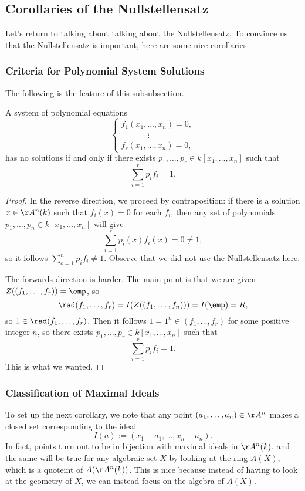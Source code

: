 \subsection{Corollaries of the Nullstellensatz}
Let's return to talking about talking about the Nullstellensatz. To convince us that the Nullstellensatz is important, here are some nice corollaries.

\subsubsection{Criteria for Polynomial System Solutions}
The following is the feature of this subsubsection.
\begin{corollary}
	A system of polynomial equations
	\[\begin{cases}
		f_1(x_1,\ldots,x_n) = 0, \\
		\qquad\quad~\vdots \\
		f_r(x_1,\ldots,x_n) = 0,
	\end{cases}\]
	has no solutions if and only if there exists $p_1,\ldots,p_r\in k[x_1,\ldots,x_n]$ such that
	\[\sum_{i=1}^rp_if_i=1.\]
\end{corollary}
\begin{proof}
	In the reverse direction, we proceed by contraposition: if there is a solution $x\in\AA^n(k)$ such that $f_i(x)=0$ for each $f_i$, then any set of polynomials $p_1,\ldots,p_n\in k[x_1,\ldots,x_n]$ will give
	\[\sum_{i=1}^rp_i(x)f_i(x)=0\ne1,\]
	so it follows $\sum_{o=1}^np_if_i\ne1$. Observe that we did not use the Nullstellensatz here.

	The forwards direction is harder. The main point is that we are given $Z((f_1,\ldots,f_r))=\emp$, so
	\[\rad(f_1,\ldots,f_r)=I(Z((f_1,\ldots,f_n)))=I(\emp)=R,\]
	so $1\in\rad(f_1,\ldots,f_r)$. Then it follows $1=1^n\in(f_1,\ldots,f_r)$ for some positive integer $n$, so there exists $p_1,\ldots,p_r\in k[x_1,\ldots,x_n]$ such that
	\[\sum_{i=1}^rp_if_i=1.\]
	This is what we wanted.
\end{proof}

\subsubsection{Classification of Maximal Ideals}
To set up the next corollary, we note that any point $(a_1,\ldots,a_n)\in\AA^n$ makes a closed set corresponding to the ideal
\[I(a):=(x_1-a_1,\ldots,x_n-a_n).\]
In fact, points turn out to be in bijection with maximal ideals in $\AA^n(k)$, and the same will be true for any algebraic set $X$ by looking at the ring $A(X)$, which is a quoteint of $A(\AA^n(k))$. This is nice because instead of having to look at the geometry of $X$, we can instead focus on the algebra of $A(X)$.

